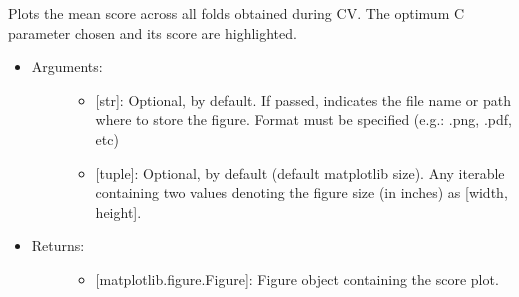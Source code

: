 \documentclass[letterpaper,10pt,english]{sphinxmanual}
\begin{document}
\begin{fulllineitems}
\begin{fulllineitems}
\label{\detokenize{models:data_tools.models.Lasso.plot_score}}
Plots the mean score across all folds obtained during CV.
The optimum C parameter chosen and its score are highlighted.
\begin{itemize}
\item {} \begin{description}
\item[{Arguments:}] \leavevmode\begin{itemize}
\item {} 
 {[}str{]}: Optional,  by default. If
passed, indicates the file name or path where to store the
figure. Format must be specified (e.g.: .png, .pdf, etc)

\item {} 
 {[}tuple{]}: Optional,  by default (default
matplotlib size). Any iterable containing two values
denoting the figure size (in inches) as {[}width, height{]}.

\end{itemize}

\end{description}

\item {} \begin{description}
\item[{Returns:}] \leavevmode\begin{itemize}
\item {} 
{[}matplotlib.figure.Figure{]}: Figure object containing the
score plot.

\end{itemize}

\end{description}

\end{itemize}

\end{fulllineitems}


\end{fulllineitems}

\end{document}

